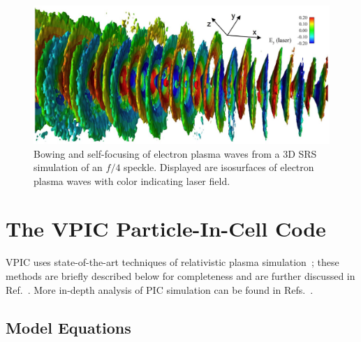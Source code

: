\documentclass[journal,twoside]{IEEEtran}
\begin{document}


\begin{figure}
\begin{center}
\includegraphics[width=7in]{figs/lpi.eps}
\caption{Bowing and self-focusing of electron plasma waves from a
3D SRS simulation of an $f/4$ speckle. Displayed are isosurfaces of
electron plasma waves with color indicating laser field.}
\label{fig:lpi}
\end{center}
\end{figure}

\section{The VPIC Particle-In-Cell Code}

VPIC uses state-of-the-art techniques of relativistic plasma
simulation~\cite{Blahovec_et_al_2000,Eastwood_et_al_1995,Jones_et_al_1996,Kwan_Snell_1985,Nieter_Cary_2004,Verboncoeur_et_al_1995};
these methods are briefly described below for completeness and are
further discussed in Ref.~\cite{Bowers_et_al_Phys_Plasmas_2007}.  More
in-depth analysis of PIC simulation can be found in
Refs.~\cite{Birdsall_Langdon_1985,Hockney_Eastwood_1988}.

\subsection{Model Equations}
\end{document}
